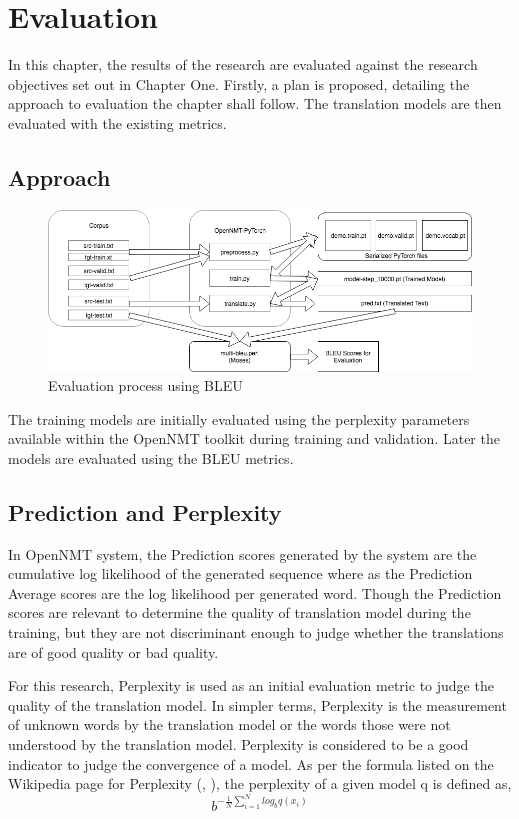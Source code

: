 \chapter{Evaluation}
In this chapter, the results of the research are evaluated against the research objectives set out in Chapter One. Firstly, a plan is proposed, detailing the approach to evaluation the chapter shall follow. The translation models are then evaluated with the existing metrics.
\section{Approach}

\begin{figure}[h]
\includegraphics[width=\textwidth]{figures/multibleu.png}
\caption{Evaluation process using BLEU} 
\label{multibleu}
\end{figure}

The training models are initially evaluated using the perplexity parameters available within the OpenNMT toolkit during training and validation. Later the models are evaluated using the BLEU metrics.  

\section{Prediction and Perplexity}
In OpenNMT system, the Prediction scores generated by the system are the cumulative log likelihood of the generated sequence where as the Prediction Average scores are the log likelihood per generated word. Though the Prediction scores are relevant to determine the quality of translation model during the training, but they are not discriminant enough to judge whether the translations are of good quality or bad quality. 

For this research, Perplexity is used as an initial evaluation metric to judge the quality of the translation model. In simpler terms, Perplexity is the measurement of unknown words by the translation model or the words those were not understood by the translation model. Perplexity is considered to be a good indicator to judge the convergence of a model.
As per the formula listed on the Wikipedia page for Perplexity (\citeauthor{wiki:xxx}, \citeyear{wiki:xxx}),
the perplexity of a given model q is defined as,
\begin{equation*}
    b^{-{\frac{1}{N}} \sum_{i=1}^N log_b q(x_i)}
\end{equation*}

